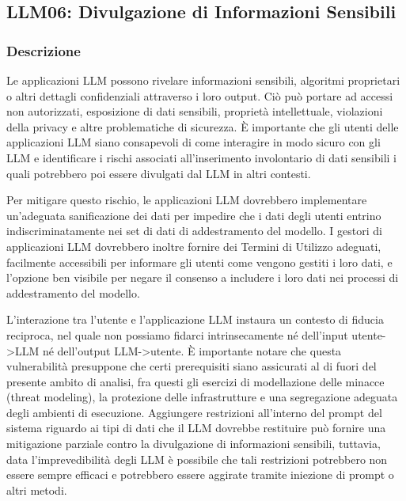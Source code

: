 \documentclass[
]{article}
\author{}
\date{}
\begin{document}
\subsection{LLM06: Divulgazione di Informazioni
Sensibili}\label{llm06-divulgazione-di-informazioni-sensibili}

\subsubsection{Descrizione}\label{descrizione}

Le applicazioni LLM possono rivelare informazioni sensibili, algoritmi
proprietari o altri dettagli confidenziali attraverso i loro output. Ciò
può portare ad accessi non autorizzati, esposizione di dati sensibili,
proprietà intellettuale, violazioni della privacy e altre problematiche
di sicurezza. È importante che gli utenti delle applicazioni LLM siano
consapevoli di come interagire in modo sicuro con gli LLM e identificare
i rischi associati all'inserimento involontario di dati sensibili i
quali potrebbero poi essere divulgati dal LLM in altri contesti.

Per mitigare questo rischio, le applicazioni LLM dovrebbero implementare
un'adeguata sanificazione dei dati per impedire che i dati degli utenti
entrino indiscriminatamente nei set di dati di addestramento del
modello. I gestori di applicazioni LLM dovrebbero inoltre fornire dei
Termini di Utilizzo adeguati, facilmente accessibili per informare gli
utenti come vengono gestiti i loro dati, e l'opzione ben visibile per
negare il consenso a includere i loro dati nei processi di addestramento
del modello.

L'interazione tra l'utente e l'applicazione LLM instaura un contesto di
fiducia reciproca, nel quale non possiamo fidarci intrinsecamente né
dell'input utente-\textgreater LLM né dell'output
LLM-\textgreater utente. È importante notare che questa vulnerabilità
presuppone che certi prerequisiti siano assicurati al di fuori del
presente ambito di analisi, fra questi gli esercizi di modellazione
delle minacce (threat modeling), la protezione delle infrastrutture e
una segregazione adeguata degli ambienti di esecuzione. Aggiungere
restrizioni all'interno del prompt del sistema riguardo ai tipi di dati
che il LLM dovrebbe restituire può fornire una mitigazione parziale
contro la divulgazione di informazioni sensibili, tuttavia, data
l'imprevedibilità degli LLM è possibile che tali restrizioni potrebbero
non essere sempre efficaci e potrebbero essere aggirate tramite
iniezione di prompt o altri metodi.
\end{document}
